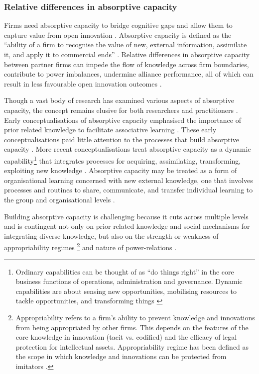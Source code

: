 \subsubsection{Relative differences in absorptive capacity}

Firms need absorptive capacity to bridge cognitive gaps and allow them to capture value from open innovation \citep{vanhaverbeke2007connecting}. Absorptive capacity is defined as the \enquote{ability of a firm to recognise the value of new, external information, assimilate it, and apply it to commercial ends} \citep{cohen1990absorptive}. Relative differences in absorptive capacity between partner firms can impede the flow of knowledge across firm boundaries, contribute to power imbalances, undermine alliance performance, all of which can result in less favourable open innovation outcomes \citep{szulanski1996exploring,lane1998relative,nooteboom2000learning,vanhaverbeke2007connecting,easterby2008absorptive,phelps2012knowledge} \medskip.
 
Though a vast body of research has examined various aspects of absorptive capacity, the concept remains elusive for both researchers and practitioners \citep{duchek2013capturing,omidvar2013revisiting}. Early conceptualisations of absorptive capacity emphasised the importance of prior related knowledge to facilitate associative learning \citep{cohen1990absorptive}. These early conceptualisations paid little attention to the processes that build absorptive capacity \citep{zahra2002absorptive}. More recent conceptualisations treat absorptive capacity as a dynamic capability\footnote{Ordinary capabilities can be thought of as \enquote{do things right} in the core business functions of operations, administration and governance. Dynamic capabilities are about sensing new opportunities, mobilising resources to tackle opportunities, and transforming things \citep{teece2014foundations}} that integrates processes for acquiring, assimilating, transforming, exploiting new knowledge \citep{zahra2002absorptive,todorova2007absorptive,volberda2010perspective,lewin2011microfoundations,marabelli2014knowing}. Absorptive capacity may be treated as a form of organisational learning concerned with new external knowledge, one that involves processes and routines to share, communicate, and transfer individual learning to the group and organisational levels \citep{sun2010examination}. \medskip

Building absorptive capacity is challenging because it cuts across multiple levels and is contingent not only on prior related knowledge and social mechanisms for integrating diverse knowledge, but also on the strength or weakness of appropriability regimes \footnote{Appropriability refers to a firm's ability to prevent knowledge and innovations from being appropriated by other firms. This depends on the features of the core knowledge in innovation (tacit vs. codified) and the efficacy of legal protection for intellectual assets.   \citep{teece1998capturing}Appropriability regime has been defined as the scope in which knowledge and innovations can be protected from imitators .} and nature of power-relations \citep{todorova2007absorptive,easterby2008absorptive,duchek2013capturing}. \medskip 

